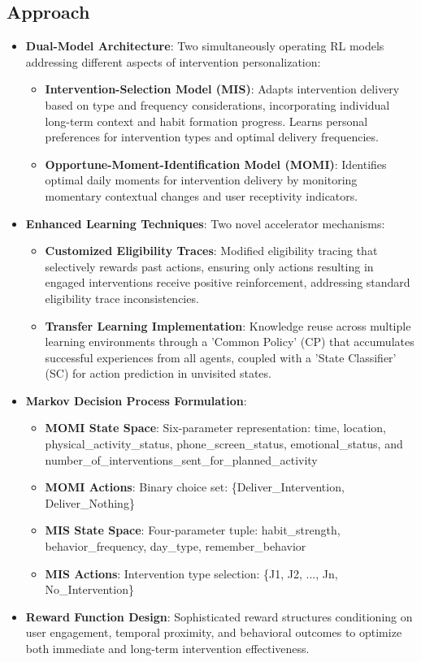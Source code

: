 \subsection*{Approach}
\begin{itemize}
    \item \textbf{Dual-Model Architecture}: Two simultaneously operating RL models addressing different aspects of intervention personalization:
    \begin{itemize}
        \item \textbf{Intervention-Selection Model (MIS)}: Adapts intervention delivery based on type and frequency considerations, incorporating individual long-term context and habit formation progress. Learns personal preferences for intervention types and optimal delivery frequencies.
        \item \textbf{Opportune-Moment-Identification Model (MOMI)}: Identifies optimal daily moments for intervention delivery by monitoring momentary contextual changes and user receptivity indicators.
    \end{itemize}
    \item \textbf{Enhanced Learning Techniques}: Two novel accelerator mechanisms:
    \begin{itemize}
        \item \textbf{Customized Eligibility Traces}: Modified eligibility tracing that selectively rewards past actions, ensuring only actions resulting in engaged interventions receive positive reinforcement, addressing standard eligibility trace inconsistencies.
        \item \textbf{Transfer Learning Implementation}: Knowledge reuse across multiple learning environments through a 'Common Policy' (CP) that accumulates successful experiences from all agents, coupled with a 'State Classifier' (SC) for action prediction in unvisited states.
    \end{itemize}
    \item \textbf{Markov Decision Process Formulation}:
    \begin{itemize}
        \item \textbf{MOMI State Space}: Six-parameter representation: time, location, physical\_activity\_status, phone\_screen\_status, emotional\_status, and number\_of\_interventions\_sent\_for\_planned\_activity
        \item \textbf{MOMI Actions}: Binary choice set: \{Deliver\_Intervention, Deliver\_Nothing\}
        \item \textbf{MIS State Space}: Four-parameter tuple: habit\_strength, behavior\_frequency, day\_type, remember\_behavior
        \item \textbf{MIS Actions}: Intervention type selection: \{J1, J2, ..., Jn, No\_Intervention\}
    \end{itemize}
    \item \textbf{Reward Function Design}: Sophisticated reward structures conditioning on user engagement, temporal proximity, and behavioral outcomes to optimize both immediate and long-term intervention effectiveness.
\end{itemize}

